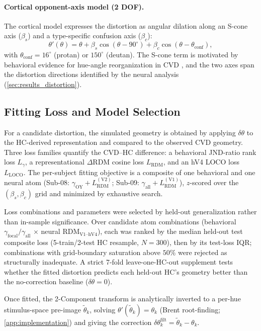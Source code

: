 \documentclass{article}
\begin{document}
\paragraph{Cortical opponent-axis model (2 DOF).}
The cortical model expresses the distortion as angular dilation along an S-cone axis ($\beta_s$) and a type-specific confusion axis ($\beta_c$):
\begin{equation}
\theta'(\theta) = \theta + \beta_s \cos(\theta - 90^\circ) + \beta_c \cos(\theta - \theta_{\text{conf}}),
\label{eq:2comp}
\end{equation}
with $\theta_{\text{conf}} = 16^\circ$ (protan) or $150^\circ$ (deutan).
The S-cone term is motivated by behavioral evidence for hue-angle reorganization in CVD \citep{emery2021}, and the two axes span the distortion directions identified by the neural analysis (\cref{sec:results_distortion}).

\subsection{Fitting Loss and Model Selection}
\label{sec:methods_select}

For a candidate distortion, the simulated geometry is obtained by applying $\delta\theta$ to the HC-derived representation and compared to the observed CVD geometry.
Three loss families quantify the CVD--HC difference: a behavioral JND-ratio rank loss $L_\gamma$, a representational $\Delta$RDM cosine loss $L_{\text{RDM}}$, and an hV4 LOCO loss $L_{\text{LOCO}}$.
The per-subject fitting objective is a composite of one behavioral and one neural atom (Sub-08: $\gamma_{\text{OY}} + L_{\text{RDM}}^{(\text{V2})}$; Sub-09: $\gamma_{\text{all}} + L_{\text{RDM}}^{(\text{V1})}$), $z$-scored over the $(\beta_s, \beta_c)$ grid and minimized by exhaustive search.

Loss combinations and parameters were selected by held-out generalization rather than in-sample significance.
Over candidate atom combinations (behavioral $\gamma_{\text{focal}}/\gamma_{\text{all}}$ $\times$ neural $\text{RDM}_{\text{V1--hV4}}$), each was ranked by the median held-out test composite loss (5-train/2-test HC resample, $N{=}300$), then by its test-loss IQR; combinations with grid-boundary saturation above $50\%$ were rejected as structurally inadequate.
A strict 7-fold leave-one-HC-out supplement tests whether the fitted distortion predicts each held-out HC's geometry better than the no-correction baseline ($\delta\theta = 0$).

Once fitted, the 2-Component transform is analytically inverted to a per-hue stimulus-space pre-image $\tilde\theta_k$, solving $\theta'(\tilde\theta_k) = \theta_k$ (Brent root-finding; \cref{app:implementation}) and giving the correction $\delta\theta_k^{\text{filt}} = \tilde\theta_k - \theta_k$.
\end{document}
